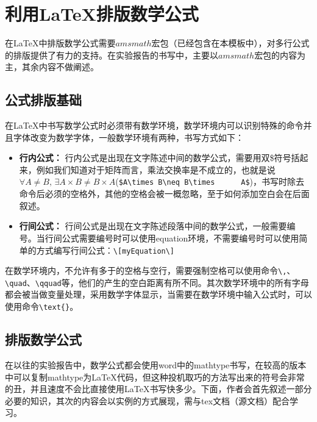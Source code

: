\chapter{利用\LaTeX 排版数学公式}
在\LaTeX 中排版数学公式需要$amsmath$宏包（已经包含在本模板中），对多行公式的排版提供了有力的支持。在实验报告的书写中，主要以$amsmath$宏包的内容为主，其余内容不做阐述。
\section{公式排版基础}
在\LaTeX 中书写数学公式时必须带有数学环境，数学环境内可以识别特殊的命令并且字体改变为数学字体，一般数学环境有两种，书写方式如下：
\begin{itemize}
\item \textbf{行内公式：} 行内公式是出现在文字陈述中间的数学公式，需要用双\$符号括起来，例如我们知道对于矩阵而言，乘法交换率是不成立的，也就是说\\$\forall A\neq B,\, \exists A\times B\neq B\times      A$(\verb|$A\times B\neq B\times      A$|)，书写时除去命令后必须的空格外，其他的空格会被一概忽略，至于如何添加空白会在后面叙述。
\item \textbf{行间公式：} 行间公式是出现在文字陈述段落中间的数学公式，一般需要编号。当行间公式需要编号时可以使用equation环境，不需要编号时可以使用简单的方式编写行间公式：\verb|\[myEquation\]|
\end{itemize}

在数学环境内，不允许有多于的空格与空行，需要强制空格可以使用命令\verb|\,|、\verb|\quad|、\verb|\qquad|等，他们的产生的空白距离有所不同。其次数学环境中的所有字母都会被当做变量处理，采用数学字体显示，当需要在数学环境中输入公式时，可以使用命令\verb|\text{}|。
\section{排版数学公式}
在以往的实验报告中，数学公式都会使用word中的mathtype书写，在较高的版本中可以复制mathtype为\LaTeX 代码，但这种投机取巧的方法写出来的符号会非常的丑，并且速度不会比直接使用\LaTeX 书写快多少。下面，作者会首先叙述一部分必要的知识，其次的内容会以实例的方式展现，需与tex文档（源文档）配合学习。

